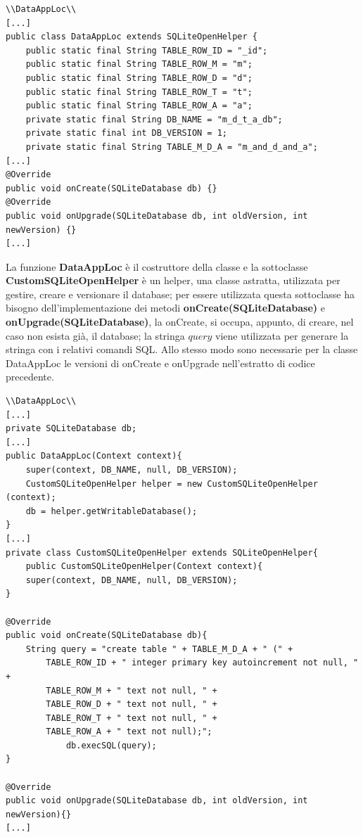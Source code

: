 \documentclass[a4paper, 50pt, twoside]{article}
\begin{document}
\begin{lstlisting}
\\DataAppLoc\\
[...]
public class DataAppLoc extends SQLiteOpenHelper {
	public static final String TABLE_ROW_ID = "_id";
	public static final String TABLE_ROW_M = "m";
	public static final String TABLE_ROW_D = "d";
	public static final String TABLE_ROW_T = "t";
	public static final String TABLE_ROW_A = "a";
	private static final String DB_NAME = "m_d_t_a_db";
	private static final int DB_VERSION = 1;
	private static final String TABLE_M_D_A = "m_and_d_and_a";
[...]
@Override
public void onCreate(SQLiteDatabase db) {}
@Override
public void onUpgrade(SQLiteDatabase db, int oldVersion, int newVersion) {}
[...]
\end{lstlisting}

La funzione \textbf{DataAppLoc} è il costruttore della classe e la sottoclasse \textbf{CustomSQLiteOpenHelper} è un helper, una classe astratta, utilizzata per gestire, creare e versionare il database; per essere utilizzata questa sottoclasse ha bisogno dell'implementazione dei metodi \textbf{onCreate(SQLiteDatabase)} e \textbf{onUpgrade(SQLiteDatabase)}, la onCreate, si occupa, appunto, di creare, nel caso non esista già, il database; la stringa $query$ viene utilizzata per generare la stringa con i relativi comandi SQL. Allo stesso modo sono necessarie per la classe DataAppLoc le versioni di onCreate e onUpgrade nell'estratto di codice precedente.

\begin{lstlisting}
\\DataAppLoc\\
[...]
private SQLiteDatabase db;
[...]
public DataAppLoc(Context context){
	super(context, DB_NAME, null, DB_VERSION);
	CustomSQLiteOpenHelper helper = new CustomSQLiteOpenHelper (context);
	db = helper.getWritableDatabase();
}
[...]
private class CustomSQLiteOpenHelper extends SQLiteOpenHelper{
	public CustomSQLiteOpenHelper(Context context){
	super(context, DB_NAME, null, DB_VERSION);
}

@Override
public void onCreate(SQLiteDatabase db){
	String query = "create table " + TABLE_M_D_A + " (" + 
		TABLE_ROW_ID + " integer primary key autoincrement not null, " + 
		TABLE_ROW_M + " text not null, " + 
		TABLE_ROW_D + " text not null, " + 
		TABLE_ROW_T + " text not null, " + 
		TABLE_ROW_A + " text not null);";
            db.execSQL(query);
}

@Override
public void onUpgrade(SQLiteDatabase db, int oldVersion, int newVersion){}
[...]
\end{lstlisting}
\end{document}
